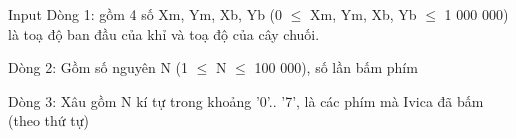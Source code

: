 Input
Dòng 1: gồm 4 số Xm, Ym, Xb, Yb (0 $\le$  Xm, Ym, Xb, Yb $\le$ 1 000 000) là toạ độ ban đầu của khỉ và toạ độ của cây chuối.  

   Dòng 2: Gồm số nguyên N (1 $\le$ N $\le$ 100 000), số lần bấm phím  

   Dòng 3: Xâu gồm N kí tự trong khoảng '0'.. '7', là các phím mà Ivica đã bấm (theo thứ tự)